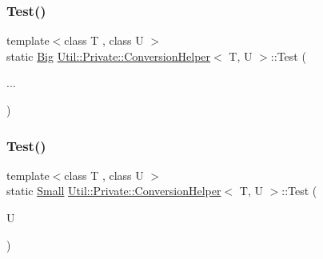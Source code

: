 \mbox{\label{structUtil_1_1Private_1_1ConversionHelper_a70eb55dfb70dbf3459524083d35e350b}} 
\subsubsection{\texorpdfstring{Test()}{Test()}\hspace{0.1cm}{\footnotesize\ttfamily [3/6]}}
{\footnotesize\ttfamily template$<$class T , class U $>$ \\
static \mbox{\hyperlink{structUtil_1_1Private_1_1ConversionHelper_1_1Big}{Big}} \mbox{\hyperlink{structUtil_1_1Private_1_1ConversionHelper}{Util\+::\+Private\+::\+Conversion\+Helper}}$<$ T, U $>$\+::Test (\begin{DoxyParamCaption}\item[{}]{... }\end{DoxyParamCaption})\hspace{0.3cm}{\ttfamily [static]}}

\mbox{\label{structUtil_1_1Private_1_1ConversionHelper_aeee49a75a44a57a9fec054caca088db9}} 
\subsubsection{\texorpdfstring{Test()}{Test()}\hspace{0.1cm}{\footnotesize\ttfamily [4/6]}}
{\footnotesize\ttfamily template$<$class T , class U $>$ \\
static \mbox{\hyperlink{structUtil_1_1Private_1_1ConversionHelper_aaaf6583019b5246d4676b56923632385}{Small}} \mbox{\hyperlink{structUtil_1_1Private_1_1ConversionHelper}{Util\+::\+Private\+::\+Conversion\+Helper}}$<$ T, U $>$\+::Test (\begin{DoxyParamCaption}\item[{U}]{ }\end{DoxyParamCaption})\hspace{0.3cm}{\ttfamily [static]}}


